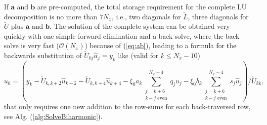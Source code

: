 \documentclass[preprint]{elsarticle}
\newcommand{\N}[1]{\check{#1}}
\begin{document}
If $\bm{a}$ and $\bm{b}$ 
are pre-computed, 
the total storage requirement for the complete LU decomposition is no more than 
$7N_x$, i.e., two diagonals for $\N{L}$, three diagonals for $\N{U}$ plus $\bm{a}$ and 
$\bm{b}$. The solution of the complete system can be obtained very quickly with 
one simple forward elimination and a back solve, where the back 
solve is very fast ($\mathcal{O}(N_x)$) because of (\ref{eq:ab}), leading 
to a formula for the backwards substitution of $\N{U}_{kj} \hat{u}_j = y_k$ like (valid for $k \le N_x-10$)
\begin{equation}
\hat{u}_k = \left(y_k - \N{U}_{k, k+2} \hat{u}_{k+2} - \N{U}_{k, k+4} \hat{u}_{k+4} - 
\xi_0 a_k\sum_{\substack{j=k+6\\k-j \text{ even}}}^{N_x-4} q_j \hat{u}_j - 
\xi_0 b_k\sum_{\substack{j=k+6\\k-j \text{ even}}}^{N_x-4} 
s_j \hat{u}_j\right)/\N{U}_{kk},
\end{equation}
that only requires 
one new addition to the row-sums for each back-traversed
row, see Alg. (\ref{alg:SolveBiharmonic}).
\end{document}
